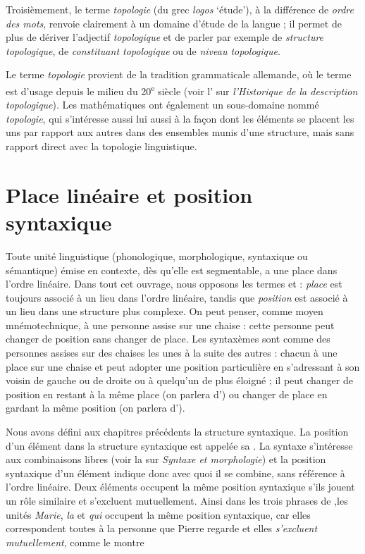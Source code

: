 Troisièmement, le terme \textit{topologie} (du grec \textit{logos} ‘étude’), à la différence de \textit{ordre des mots}, renvoie clairement à un domaine d’étude de la langue ; il permet de plus de dériver l’adjectif \textit{topologique} et de parler par exemple de \textit{structure topologique}, de \textit{constituant topologique} ou de \textit{niveau topologique}.

Le terme \textit{topologie} provient de la tradition grammaticale allemande, où le ter\-me est d’usage depuis le milieu du 20\textsuperscript{e} siècle (voir l' sur \textit{l’Historique de la description topologique}). Les mathématiques ont également un sous-domaine nommé \textit{topologie}, qui s'intéresse aussi lui aussi à la façon dont les éléments se placent les uns par rapport aux autres dans des ensembles munis d’une structure, mais sans rapport direct avec la topologie linguistique.

\section{Place linéaire et position syntaxique}\label{sec:3.5.3}

Toute unité linguistique (phonologique, morphologique, syntaxique ou sémantique) émise en contexte, dès qu’elle est segmentable, a une place dans l’ordre linéaire. Dans tout cet ouvrage, nous opposons les termes  et  : \textit{place} est toujours associé à un lieu dans l’ordre linéaire, tandis que \textit{position} est associé à un lieu dans une structure plus complexe. On peut penser, comme moyen mnémotechnique, à une personne assise sur une chaise : cette personne peut changer de position sans changer de place. Les syntaxèmes sont comme des personnes assises sur des chaises les unes à la suite des autres : chacun à une place sur une chaise et peut adopter une position particulière en s'adressant à son voisin de gauche ou de droite ou à quelqu'un de plus éloigné ; il peut changer de position en restant à la même place (on parlera d’) ou changer de place en gardant la même position (on parlera d’).

Nous avons défini aux chapitres précédents la structure syntaxique. La position d’un élément dans la structure syntaxique est appelée sa . La syntaxe s’intéresse aux combinaisons libres (voir la  sur \textit{Syntaxe et morphologie}) et la position syntaxique d’un élément indique donc avec quoi il se combine, sans référence à l’ordre linéaire. Deux éléments occupent la même position syntaxique s’ils jouent un rôle similaire et s’excluent mutuellement. Ainsi dans les trois phrases de  ,les unités  \textit{Marie}, \textit{la} et \textit{qui} occupent la même position syntaxique, car elles correspondent toutes à la personne que Pierre regarde et elles \textit{s’excluent} \textit{mutuellement}, comme le montre 


